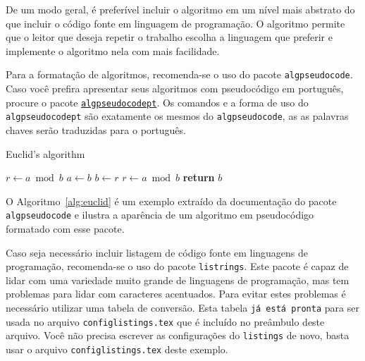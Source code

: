 \documentclass[times,english,brazil,oneside,section=TITLE]{ifes8}
\begin{document}
De um modo geral, é preferível incluir o algoritmo em um nível mais abstrato
do que incluir o código fonte em linguagem de programação. O algoritmo permite
que o leitor que deseja repetir o trabalho escolha a linguagem que preferir e
implemente o algoritmo nela com mais facilidade.

Para a formatação de algoritmos, recomenda-se o uso do pacote
\texttt{algpseudocode}. Caso você prefira apresentar seus algoritmos com
pseudocódigo em português, procure o pacote
\href{https://github.com/quigonjeff/algpseudocodept}{\texttt{algpseudocodept}}.
Os comandos e a forma de uso do \texttt{algpseudocodept} são exatamente os
mesmos do \texttt{algpseudocode}, as as palavras chaves serão traduzidas para o
português.

\begin{algorithm}
  \caption{Euclid’s algorithm}
  \label{alg:euclid}
  \begin{algorithmic}[1]
    \State $r\gets a\bmod b$
      \State $a\gets b$
      \State $b\gets r$
      \State $r\gets a\bmod b$
    \EndWhile\label{euclidendwhile}
    \State \textbf{return} $b$
    \EndProcedure
  \end{algorithmic}
\end{algorithm}

O Algoritmo~\ref{alg:euclid} é um exemplo extraído da documentação do pacote
\texttt{algpseudocode} e ilustra a aparência de um algoritmo em pseudocódigo
formatado com esse pacote.

Caso seja necessário incluir listagem de código fonte em linguagens de
programação, recomenda-se o uso do pacote \texttt{listrings}. Este pacote
é capaz de lidar com uma variedade muito grande de linguagens de programação,
mas tem problemas para lidar com caracteres acentuados. Para evitar estes
problemas é necessário utilizar uma tabela de conversão. Esta tabela \texttt{já
  está pronta} para ser usada no arquivo \texttt{configlistings.tex} que é
incluído no preâmbulo deste arquivo. Você não precisa escrever as configurações
do \texttt{listings} de novo, basta usar o arquivo \texttt{configlistings.tex}
deste exemplo.
\end{document}
